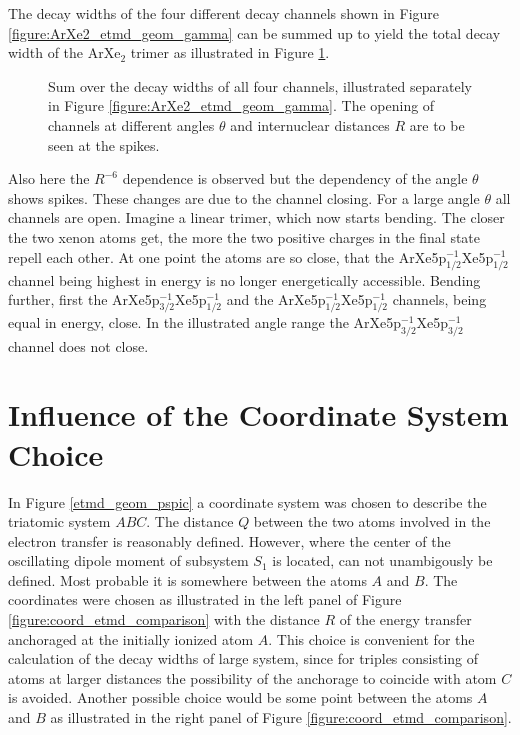 The decay widths of the four different decay channels shown in
Figure \ref{figure:ArXe2_etmd_geom_gamma} can be summed up to yield
the total decay width of the ArXe$_2$ trimer as illustrated in Figure
\ref{figure:ArXe2_etmd_geom_gamma_total}.

\begin{figure}[h]
 \centering
 
 \caption{Sum over the decay widths of all four channels, illustrated
          separately in Figure \ref{figure:ArXe2_etmd_geom_gamma}.
          The opening of channels at different angles $\theta$ and
          internuclear distances $R$ are to be seen at the spikes.}
 \label{figure:ArXe2_etmd_geom_gamma_total}
\end{figure}

Also here the $R^{-6}$ dependence is observed but the dependency
of the angle $\theta$ shows spikes. These changes are due to the channel
closing. For a large angle $\theta$ all channels are open. Imagine a linear
trimer, which now starts bending. The closer
the two xenon atoms get, the more the two positive charges in the final
state repell each other. At one point the atoms are so close, that the
ArXe5p$_{1/2}^{-1}$Xe5p$_{1/2}^{-1}$ channel being highest in energy
is no longer energetically accessible. Bending further, first the
ArXe5p$_{3/2}^{-1}$Xe5p$_{1/2}^{-1}$ and the
ArXe5p$_{1/2}^{-1}$Xe5p$_{1/2}^{-1}$ channels, being equal in energy,
close. In the illustrated angle range the ArXe5p$_{3/2}^{-1}$Xe5p$_{3/2}^{-1}$
channel does not close.


\section{Influence of the Coordinate System Choice} \label{section:coord_choice}
In Figure \ref{etmd_geom_pspic} a coordinate
system was chosen to describe the
triatomic system $ABC$. The distance $Q$ between the two atoms involved
in the electron transfer is reasonably defined. However, where the
center of the oscillating dipole moment of subsystem $S_1$ is located, can
not unambigously be defined. Most
probable it is somewhere between the atoms $A$ and $B$.
The coordinates were chosen as illustrated in the left panel of Figure
\ref{figure:coord_etmd_comparison} with the distance $R$ of the energy transfer
anchoraged at the initially ionized atom $A$. This choice is convenient for
the calculation of the decay widths of large system, since for triples
consisting of atoms at larger distances the possibility of the anchorage to
coincide with atom $C$ is avoided.
Another possible choice would be some point between the atoms $A$ and $B$ as
illustrated in the right panel of Figure \ref{figure:coord_etmd_comparison}.

